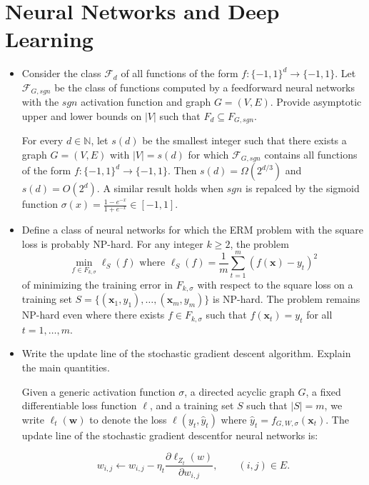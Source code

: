\newpage
\section{Neural Networks and Deep Learning}

\begin{itemize}

    \item Consider the class $\mathcal{F}_d$ of all functions of the form $f : \{-1, 1\}^d \rightarrow \{-1, 1\}$. Let $\mathcal{F}_{G,sgn}$ be the class of functions computed by a feedforward neural networks with the $sgn$ activation function and graph $G = (V, E)$. Provide asymptotic upper and lower bounds on $|V|$ such that $F_d \subseteq F_{G,sgn}$.  

        For every $d \in \mathbb{N}$, let $s(d)$ be the smallest integer such that there exists a graph $G = (V, E)$ with $|V| = s(d)$ for which $\mathcal{F}_{G, sgn}$ contains all functions of the form $f : \{-1, 1\}^d \rightarrow \{-1, 1\}$. Then $s(d) = \Omega(2^{d/3})$ and $s(d) = O(2^d)$. A similar result holds when $sgn$ is repalced by the sigmoid function $\sigma(x) = \frac{1 - e^{-x}}{1 + e^{-x}} \in [-1,1]$.

    \item Define a class of neural networks for which the ERM problem with the square loss is probably NP-hard.
        For any integer $k \geq 2$, the problem
$$\min_{f \in F_{k, \sigma}} \ell_S(f) \text{ where } \ell_S(f) = \frac{1}{m} \sum_{t=1}^m (f(\bm{x})- y_t)^2$$
of minimizing the training error in $F_{k,\sigma}$ with respect to the square loss on a training set $S = \{(\bm{x}_1,y_1),\dots,(\bm{x}_m, y_m)\}$ is NP-hard. The problem remains NP-hard even where there exists $f \in F_{k,\sigma}$ such that $f(\bm{x}_t) = y_t$ for all $t=1,\dots,m$.

    \item Write the update line of the stochastic gradient descent algorithm. Explain the main quantities.

        Given a generic activation function $\sigma$, a directed acyclic graph $G$, a fixed differentiable loss function $\ell$, and a training set $S$ such that $|S| = m$, we write $\ell_t(\bm{w})$ to denote the loss $\ell (y_t, \hat{y}_t)$ where $\hat{y}_t = f_{G, W, \sigma} (\bm{x}_t)$. The update line of the stochastic gradient descentfor neural networks is:

$$w_{i,j} \leftarrow w_{i,j} - \eta_t \frac{\partial \ell_{Z_t} (w)}{\partial w_{i,j}},\qquad (i,j) \in E.$$


\end{itemize}
